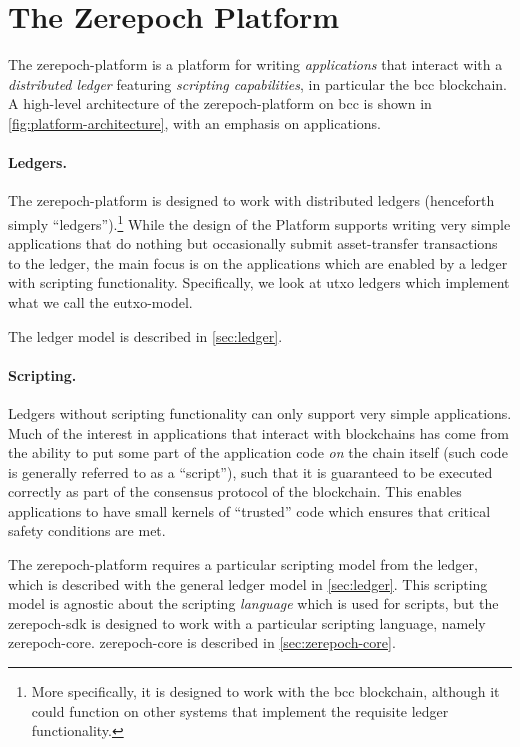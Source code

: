 \section{The Zerepoch Platform}

The \gls{zerepoch-platform} is a platform for writing \emph{applications} that interact with a \emph{distributed ledger} featuring \emph{scripting capabilities}, in particular the \gls{bcc} blockchain.
A high-level architecture of the \gls{zerepoch-platform} on \gls{bcc} is shown in \cref{fig:platform-architecture}, with an emphasis on applications.

\paragraph{Ledgers.}
The \gls{zerepoch-platform} is designed to work with distributed ledgers (henceforth simply ``ledgers'').\footnote{
More specifically, it is designed to work with the \gls{bcc} blockchain, although it could function on other systems that implement the requisite ledger functionality.
}
While the design of the Platform supports writing very simple applications that do nothing but occasionally submit asset-transfer transactions to the ledger, the main focus is on the applications which are enabled by a ledger with scripting functionality.
Specifically, we look at \gls{utxo} ledgers which implement what we call the \gls{eutxo-model}.

The ledger model is described in \cref{sec:ledger}.

\paragraph{Scripting.}
Ledgers without scripting functionality can only support very simple applications.
Much of the interest in applications that interact with blockchains has come from the ability to put some part of the application code \emph{on} the chain itself (such code is generally referred to as a ``\gls{script}''), such that it is guaranteed to be executed correctly as part of the consensus protocol of the blockchain.
This enables applications to have small kernels of ``trusted'' code which ensures that critical safety conditions are met.

The \gls{zerepoch-platform} requires a particular scripting model from the ledger, which is described with the general ledger model in \cref{sec:ledger}.
This scripting model is agnostic about the scripting \emph{language} which is used for \glspl{script}, but the \gls{zerepoch-sdk} is designed to work with a particular scripting language, namely \gls{zerepoch-core}. \Gls{zerepoch-core} is described in \cref{sec:zerepoch-core}.

